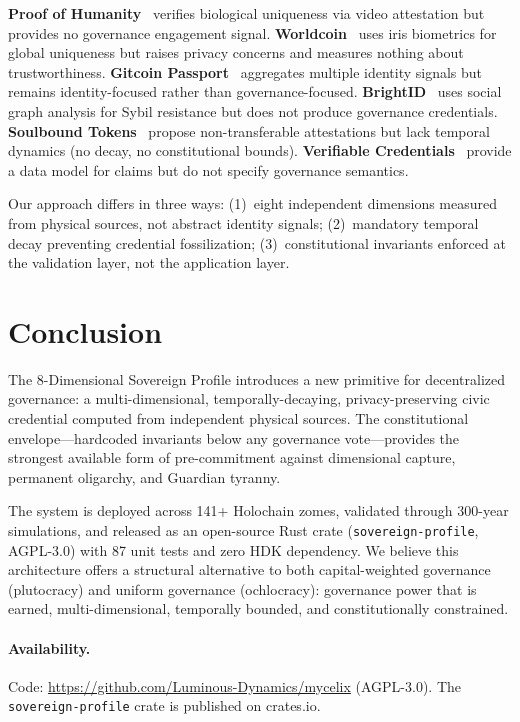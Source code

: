 \documentclass[11pt,twocolumn]{article}
\begin{document}
\textbf{Proof of Humanity}~\citep{poh2021} verifies biological uniqueness via video attestation but provides no governance engagement signal. \textbf{Worldcoin}~\citep{worldcoin2023} uses iris biometrics for global uniqueness but raises privacy concerns and measures nothing about trustworthiness. \textbf{Gitcoin Passport}~\citep{gitcoin2023} aggregates multiple identity signals but remains identity-focused rather than governance-focused. \textbf{BrightID}~\citep{brightid2020} uses social graph analysis for Sybil resistance but does not produce governance credentials. \textbf{Soulbound Tokens}~\citep{weyl2022} propose non-transferable attestations but lack temporal dynamics (no decay, no constitutional bounds). \textbf{Verifiable Credentials}~\citep{w3c2022vc} provide a data model for claims but do not specify governance semantics.

Our approach differs in three ways: (1)~eight independent dimensions measured from physical sources, not abstract identity signals; (2)~mandatory temporal decay preventing credential fossilization; (3)~constitutional invariants enforced at the validation layer, not the application layer.

\section{Conclusion}
\label{sec:conclusion}

The 8-Dimensional Sovereign Profile introduces a new primitive for decentralized governance: a multi-dimensional, temporally-decaying, privacy-preserving civic credential computed from independent physical sources. The constitutional envelope---hardcoded invariants below any governance vote---provides the strongest available form of pre-commitment against dimensional capture, permanent oligarchy, and Guardian tyranny.

The system is deployed across 141+ Holochain zomes, validated through 300-year simulations, and released as an open-source Rust crate (\texttt{sovereign-profile}, AGPL-3.0) with 87 unit tests and zero HDK dependency. We believe this architecture offers a structural alternative to both capital-weighted governance (plutocracy) and uniform governance (ochlocracy): governance power that is earned, multi-dimensional, temporally bounded, and constitutionally constrained.

\paragraph{Availability.} Code: \url{https://github.com/Luminous-Dynamics/mycelix} (AGPL-3.0). The \texttt{sovereign-profile} crate is published on crates.io.
\end{document}
